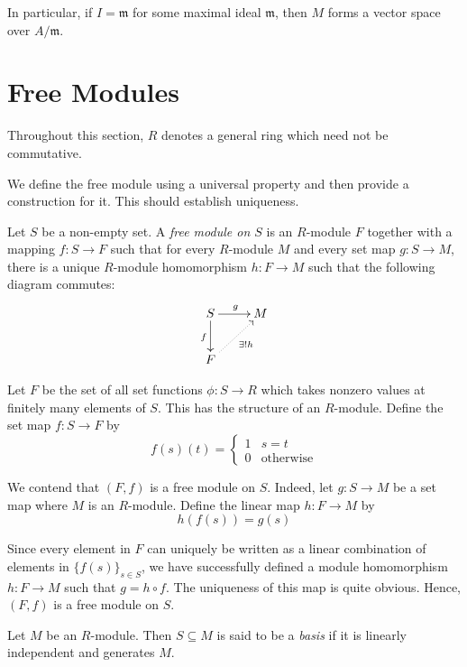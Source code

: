 In particular, if $I = \mathfrak m$ for some maximal ideal $\mathfrak m$, then $M$ forms a vector space over $A/\mathfrak m$.

\section{Free Modules}
Throughout this section, $R$ denotes a general ring which need not be commutative.

We define the free module using a universal property and then provide a construction for it. This should establish uniqueness.

\begin{definition}
    Let $S$ be a non-empty set. A \textit{free module on $S$} is an $R$-module $F$ together with a mapping $f: S\to F$ such that for every $R$-module $M$ and every set map $g: S\to M$, there is a unique $R$-module homomorphism $h: F\to M$ such that the following diagram commutes: 
    \begin{equation*}
    \xymatrix{
        S\ar[r]^g\ar[d]_f & M\\
        F\ar@{.>}[ru]_{\exists! h}
    }
    \end{equation*}
\end{definition}

Let $F$ be the set of all set functions $\phi: S\to R$ which takes nonzero values at finitely many elements of $S$. This has the structure of an $R$-module. Define the set map $f: S\to F$ by 
\begin{equation*}
    f(s)(t) = 
    \begin{cases}
        1 & s = t\\
        0 & \text{otherwise}
    \end{cases}
\end{equation*}

We contend that $(F,f)$ is a free module on $S$. Indeed, let $g: S\to M$ be a set map where $M$ is an $R$-module. Define the linear map $h: F\to M$ by 
\begin{equation*}
    h(f(s)) = g(s)
\end{equation*}

Since every element in $F$ can uniquely be written as a linear combination of elements in $\{f(s)\}_{s\in S}$, we have successfully defined a module homomorphism $h: F\to M$ such that $g = h\circ f$. The uniqueness of this map is quite obvious. Hence, $(F,f)$ is a free module on $S$.

\begin{definition}[Basis]
    Let $M$ be an $R$-module. Then $S\subseteq M$ is said to be a \textit{basis} if it is linearly independent and generates $M$.
\end{definition}

